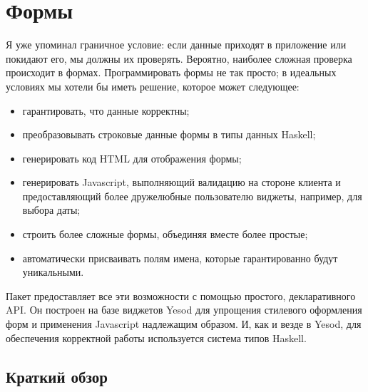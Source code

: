 \chapter{Формы}\label{chap:forms}
Я уже упоминал граничное условие: если данные приходят в приложение или
покидают его, мы должны их проверять. Вероятно, наиболее сложная проверка
происходит в формах.  Программировать формы не так просто; в идеальных
условиях мы хотели бы иметь решение, которое может следующее:

\begin{itemize}
    \item гарантировать, что данные корректны;
    \item преобразовывать строковые данные формы в типы данных Haskell;
    \item генерировать код HTML для отображения формы;
    \item генерировать Javascript, выполняющий валидацию на стороне клиента и
        предоставляющий более дружелюбные пользователю виджеты, например, для
        выбора даты;
    \item строить более сложные формы, объединяя вместе более простые;
    \item автоматически присваивать полям имена, которые гарантированно будут
        уникальными.
\end{itemize}

Пакет 
предоставляет все эти возможности с помощью простого,
декларативного API. Он построен на базе виджетов Yesod для упрощения стилевого
оформления форм и применения Javascript надлежащим образом. И, как и везде в
Yesod, для обеспечения корректной работы используется система типов Haskell.

\section{Краткий обзор}

